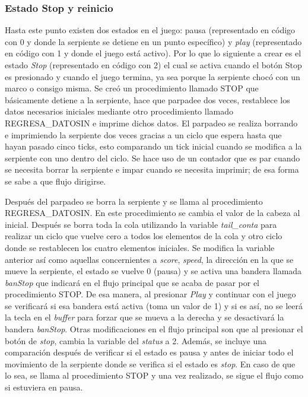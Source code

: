 \documentclass[12pt]{article}
\begin{document}
\subsubsection*{Estado Stop y reinicio}
Hasta este punto existen dos estados en el juego: pausa (representado en código con 0 y donde la serpiente se detiene en un punto específico) y \textit{play} (representado en código con 1 y donde el juego está activo). Por lo que lo siguiente a crear es el estado \textit{Stop} (representado en código con 2) el cual se activa cuando el botón Stop es presionado y cuando el juego termina, ya sea porque la serpiente chocó con un marco o consigo misma. Se creó un procedimiento llamado STOP que básicamente detiene a la serpiente, hace que parpadee dos veces, restablece los datos necesarios iniciales mediante otro procedimiento llamado REGRESA\_DATOSIN e imprime dichos datos. El parpadeo se realiza borrando e imprimiendo la serpiente dos veces gracias a un ciclo que espera hasta que hayan pasado cinco ticks, esto comparando un tick inicial cuando se modifica a la serpiente con uno dentro del ciclo. Se hace uso de un contador que es par cuando se necesita borrar la serpiente e impar cuando se necesita imprimir; de esa forma se sabe a que flujo dirigirse. 

Después del parpadeo se borra la serpiente y se llama al procedimiento REGRESA\_DATOSIN. En este procedimiento se cambia el valor de la cabeza al inicial. Después se borra toda la cola utilizando la variable \textit{tail\_conta} para realizar un ciclo que vuelve cero a todos los elementos de la cola y otro ciclo donde se restablecen los cuatro elementos iniciales. Se modifica la variable anterior así como aquellas concernientes a \textit{score}, \textit{speed}, la dirección en la que se mueve la serpiente, el estado se vuelve 0 (pausa) y se activa una bandera llamada \textit{banStop} que indicará en el flujo principal que se acaba de pasar por el procedimiento STOP. De esa manera, al presionar \textit{Play} y continuar con el juego se verificará si esa bandera está activa (toma un valor de 1) y si es así, no se leerá la tecla en el \textit{buffer} para forzar que se mueva a la derecha y se desactivará la bandera \textit{banStop}. Otras modificaciones en el flujo principal son que al presionar el botón de \textit{stop}, cambia la variable del \textit{status} a 2. Además, se incluye una comparación después de verificar si el estado es pausa y antes de iniciar todo el movimiento de la serpiente donde se verifica si el estado es \textit{stop}. En caso de que lo sea, se llama al procedimiento STOP y una vez realizado, se sigue el flujo como si estuviera en pausa. 
\end{document}
